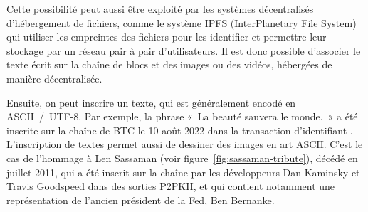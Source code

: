 Cette possibilité peut aussi être exploité par les systèmes décentralisés d'hébergement de fichiers, comme le système IPFS (InterPlanetary File System) qui utiliser les empreintes des fichiers pour les identifier et permettre leur stockage par un réseau pair à pair d'utilisateurs. Il est donc possible d'associer le texte écrit sur la chaîne de blocs et des images ou des vidéos, hébergées de manière décentralisée.

Ensuite, on peut inscrire un texte, qui est généralement encodé en ASCII~/~UTF-8. Par exemple, la phrase «~La beauté sauvera le monde.~» a été inscrite sur la chaîne de BTC le 10 août 2022 dans la transaction d'identifiant . L'inscription de textes permet aussi de dessiner des images en art ASCII. C'est le cas de l'hommage à Len Sassaman (voir figure~\ref{fig:sassaman-tribute}), décédé en juillet 2011, qui a été inscrit sur la chaîne par les développeurs Dan Kaminsky et Travis Goodspeed dans des sorties P2PKH, et qui contient notamment une représentation de l'ancien président de la Fed, Ben Bernanke.

